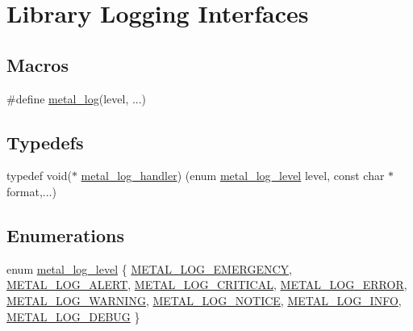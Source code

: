 \hypertarget{group__logging}{}\section{Library Logging Interfaces}
\label{group__logging}
\subsection*{Macros}
\begin{DoxyCompactItemize}
\item 
\#define \hyperlink{group__logging_ga2713c6e89935c7618532bf3e418e8dd9}{metal\+\_\+log}(level, ...)
\end{DoxyCompactItemize}
\subsection*{Typedefs}
\begin{DoxyCompactItemize}
\item 
typedef void($\ast$ \hyperlink{group__logging_gaa79b2a8962227bb67c242b98afda292a}{metal\+\_\+log\+\_\+handler}) (enum \hyperlink{group__logging_ga4ffa0f4a1339af510aca7f817ee36d82}{metal\+\_\+log\+\_\+level} level, const char $\ast$format,...)
\end{DoxyCompactItemize}
\subsection*{Enumerations}
\begin{DoxyCompactItemize}
\item 
enum \hyperlink{group__logging_ga4ffa0f4a1339af510aca7f817ee36d82}{metal\+\_\+log\+\_\+level} \{ \newline
\hyperlink{group__logging_gga4ffa0f4a1339af510aca7f817ee36d82a5ed2cd57a6ae440a1a4b987b323697b1}{M\+E\+T\+A\+L\+\_\+\+L\+O\+G\+\_\+\+E\+M\+E\+R\+G\+E\+N\+CY}, 
\hyperlink{group__logging_gga4ffa0f4a1339af510aca7f817ee36d82a99559074f6094a386ae8afb278705b0c}{M\+E\+T\+A\+L\+\_\+\+L\+O\+G\+\_\+\+A\+L\+E\+RT}, 
\hyperlink{group__logging_gga4ffa0f4a1339af510aca7f817ee36d82aa11a257eff2a78fb1f5851b04bdb14f8}{M\+E\+T\+A\+L\+\_\+\+L\+O\+G\+\_\+\+C\+R\+I\+T\+I\+C\+AL}, 
\hyperlink{group__logging_gga4ffa0f4a1339af510aca7f817ee36d82af784d6c458887a01b7478a9433454bac}{M\+E\+T\+A\+L\+\_\+\+L\+O\+G\+\_\+\+E\+R\+R\+OR}, 
\newline
\hyperlink{group__logging_gga4ffa0f4a1339af510aca7f817ee36d82a41106d05f236ca45cb2e04da44accfdc}{M\+E\+T\+A\+L\+\_\+\+L\+O\+G\+\_\+\+W\+A\+R\+N\+I\+NG}, 
\hyperlink{group__logging_gga4ffa0f4a1339af510aca7f817ee36d82a20bed4defeb0923ab9ea4d3593808e5c}{M\+E\+T\+A\+L\+\_\+\+L\+O\+G\+\_\+\+N\+O\+T\+I\+CE}, 
\hyperlink{group__logging_gga4ffa0f4a1339af510aca7f817ee36d82a3b33aa6fbeeb9f2df2f565a66c016534}{M\+E\+T\+A\+L\+\_\+\+L\+O\+G\+\_\+\+I\+N\+FO}, 
\hyperlink{group__logging_gga4ffa0f4a1339af510aca7f817ee36d82aa299187acec4c8356e14b877539ab29f}{M\+E\+T\+A\+L\+\_\+\+L\+O\+G\+\_\+\+D\+E\+B\+UG}
 \}
\end{DoxyCompactItemize}
